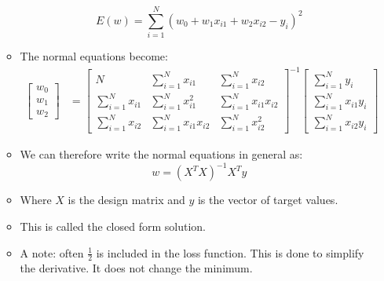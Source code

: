 \documentclass[12pt]{article}
\begin{document}
\begin{itemize}
\begin{itemize}
                        \begin{equation}
                            E(w) = \sum_{i=1}^N {(w_0 + w_1x_{i1} + w_2x_{i2} - y_i)}^2
                        \end{equation}
                        \item The normal equations become:
                        \begin{align*}
                            \begin{bmatrix}
                                w_0\\
                                w_1\\
                                w_2
                            \end{bmatrix} &= \begin{bmatrix}
                                N & \sum_{i=1}^N x_{i1} & \sum_{i=1}^N x_{i2}\\
                                \sum_{i=1}^N x_{i1} & \sum_{i=1}^N x_{i1}^2 & \sum_{i=1}^N x_{i1}x_{i2}\\
                                \sum_{i=1}^N x_{i2} & \sum_{i=1}^N x_{i1}x_{i2} & \sum_{i=1}^N x_{i2}^2
                            \end{bmatrix}^{-1} \begin{bmatrix}
                                \sum_{i=1}^N y_i\\
                                \sum_{i=1}^N {x_{i1}}y_i\\
                                \sum_{i=1}^N {x_{i2}}y_i
                            \end{bmatrix}
                        \end{align*}
                        \item We can therefore write the normal equations in general as:
                        \begin{equation}
                            w = {({X^T}X)}^{-1}{X^T}y
                        \end{equation}
                        \item Where $X$ is the design matrix and $y$ is the vector of target values.
                        \item This is called the closed form solution.
                        \item A note: often $\frac{1}{2}$ is included in the loss function. This is done to simplify the derivative. It does not change the minimum.
                    \end{itemize}

\end{itemize}
\end{document}
